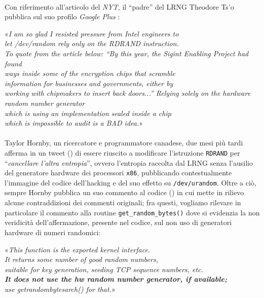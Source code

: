 \documentclass{article}
\begin{document}
 \paragraph{}Con riferimento all'articolo del \emph{NYT}, il ``padre'' del LRNG
 Theodore Ts'o pubblica sul suo profilo \emph{Google Plus} \cite{tso2}:
 \begin{center}
 «\emph{I am so glad I resisted pressure from Intel engineers to \\ 
 let /dev/random rely only on the RDRAND instruction.\\   
 To quote from the article below:\newline\newline
``By this year, the Sigint Enabling Project had found\\ 
ways inside some of the encryption chips that scramble\\
information for businesses and governments, either by \\
working with chipmakers to insert back doors...''\newline\newline
Relying solely on the hardware random number generator \\
which is using an implementation sealed inside a chip\\ 
which is impossible to audit is a BAD idea.﻿}»
 \end{center}
 \paragraph{}Taylor Hornby, un ricercatore e programmatore canadese, due mesi
 più tardi afferma in un tweet (\cite{tayl}) di essere riuscito a modificare
 l'istruzione \verb+RDRAND+ per ``\emph{cancellare l'altra entropia}'', ovvero
 l'entropia raccolta dal LRNG senza l'ausilio del generatore hardware dei
 processori \verb+x86+, pubblicando contestualmente l'immagine del codice
 dell'hacking e del suo effetto su \verb+/dev/urandom+. Oltre a ciò, sempre
 Hornby pubblica un suo commento al codice (\cite{tayl2}) in cui mette in
 rilievo alcune contraddizioni dei commenti originali; fra questi, vogliamo rilevare in
 particolare il commento alla routine \verb+get_random_bytes()+ dove
 si evidenzia la non veridicità dell'affermazione, presente nel codice, sul non
 uso di generatori hardware di numeri randomici: 
 \begin{center}
 «\emph{This function is the exported kernel interface.\\  It returns some
 number of good random numbers,\\ suitable for key generation, seeding
 TCP sequence numbers, etc.\\ \textbf{It does not use the hw random number
 generator, if available;}\\ use get\textunderscore{}random\textunderscore{}bytes\textunderscore{}arch() for
 that.}»
 \end{center}
\end{document}
